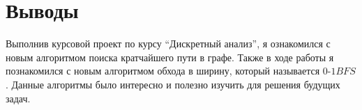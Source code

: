 \section{Выводы}
Выполнив курсовой проект по курсу \enquote{Дискретный анализ}, я ознакомился с новым алгоритмом поиска кратчайшего пути в графе. Также в ходе работы я познакомился с новым алгоритмом обхода в ширину, который называется $0$-$1$$BFS$. Данные алгоритмы было интересно и полезно изучить для решения будущих задач.
\pagebreak
